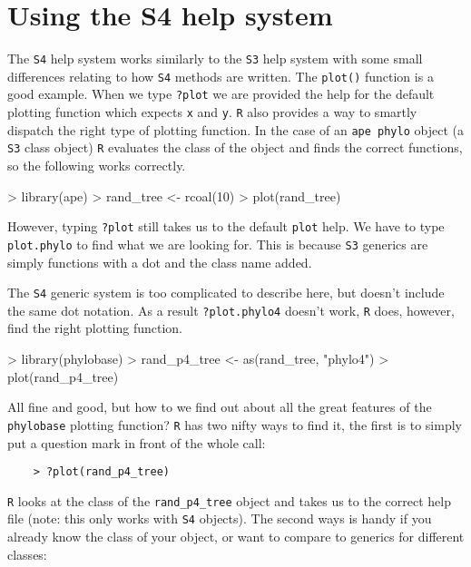 \documentclass{article}
\newcommand{\code}[1]{{{\tt #1}}}
\begin{document}
\section{Using the S4 help system}

The \code{S4} help system works similarly to the \code{S3} help system with some small differences relating to how \code{S4} methods are written.  The \code{plot()} function is a good example.  When we type \code{?plot} we are provided the help for the default plotting function which expects \code{x} and \code{y}.  \code{R} also provides a way to smartly dispatch the right type of plotting function.  In the case of an \code{ape phylo} object (a \code{S3} class object) \code{R} evaluates the class of the object and finds the correct functions, so the following works correctly.

\begin{Schunk}
\begin{Sinput}
> library(ape)
> rand_tree <- rcoal(10)
> plot(rand_tree)
\end{Sinput}
\end{Schunk}

However, typing \code{?plot} still takes us to the default \code{plot} help.  We have to type \code{plot.phylo} to find what we are looking for.  This is because \code{S3} generics are simply functions with a dot and the class name added.  

The \code{S4} generic system is too complicated to describe here, but doesn't include the same dot notation.  As a result \code{?plot.phylo4} doesn't work, \code{R} does, however, find the right plotting function.

\begin{Schunk}
\begin{Sinput}
> library(phylobase)
> rand_p4_tree <- as(rand_tree, "phylo4")
> plot(rand_p4_tree)
\end{Sinput}
\end{Schunk}

All fine and good, but how to we find out about all the great features of the \code{phylobase} plotting function?  \code{R} has two nifty ways to find it, the first is to simply put a question mark in front of the whole call:

\begin{verbatim}
	> ?plot(rand_p4_tree)
\end{verbatim}

\code{R} looks at the class of the \code{rand\_p4\_tree} object and takes us to the correct help file (note: this only works with \code{S4} objects).  The second ways is handy if you already know the class of your object, or want to compare to generics for different classes:
\end{document}
